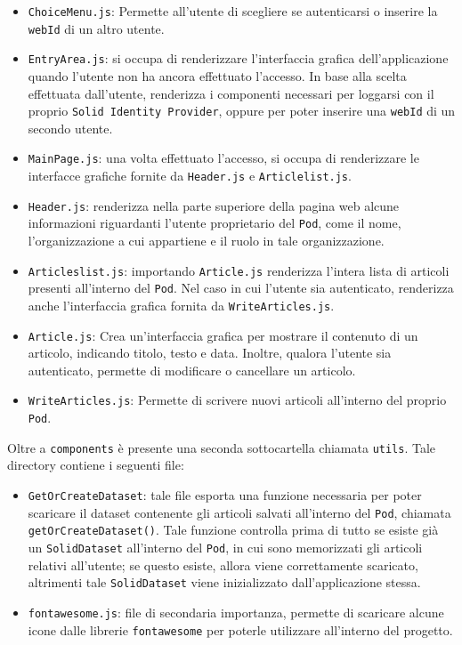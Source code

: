 \begin{itemize}
	\item {\tt ChoiceMenu.js}: Permette all'utente di scegliere se autenticarsi o inserire la {\tt webId} di un altro utente.
	\item {\tt EntryArea.js}: si occupa di renderizzare l'interfaccia grafica dell'applicazione quando l'utente non ha ancora effettuato l'accesso. In base alla scelta effettuata dall'utente, renderizza i componenti necessari per loggarsi con il proprio {\tt Solid Identity Provider}, oppure per poter inserire una {\tt webId} di un secondo utente.
	\item {\tt MainPage.js}: una volta effettuato l'accesso, si occupa di renderizzare le interfacce grafiche fornite da {\tt Header.js} e {\tt Articlelist.js}.
	\item {\tt Header.js}: renderizza nella parte superiore della pagina web alcune informazioni riguardanti l'utente proprietario del {\tt Pod}, come il nome, l'organizzazione a cui appartiene e il ruolo in tale organizzazione.
	\item {\tt Articleslist.js}: importando {\tt Article.js} renderizza l'intera lista di articoli presenti all'interno del {\tt Pod}. Nel caso in cui l'utente sia autenticato, renderizza anche l'interfaccia grafica fornita da {\tt WriteArticles.js}.
	\item {\tt Article.js}: Crea un'interfaccia grafica per mostrare il contenuto di un articolo, indicando titolo, testo e data. Inoltre, qualora l'utente sia autenticato, permette di modificare o cancellare un articolo.
	\item {\tt WriteArticles.js}: Permette di scrivere nuovi articoli all'interno del proprio {\tt Pod}.
\end{itemize}

\medskip

Oltre a {\tt components} è presente una seconda sottocartella chiamata {\tt utils}. Tale directory contiene i seguenti file:

\begin{itemize}
	\item {\tt GetOrCreateDataset}: tale file esporta una funzione necessaria per poter scaricare il dataset contenente gli articoli salvati all'interno del {\tt Pod}, chiamata\\{\tt getOrCreateDataset()}. Tale funzione controlla prima di tutto se esiste già un {\tt SolidDataset} all'interno del {\tt Pod}, in cui sono memorizzati gli articoli relativi all'utente; se questo esiste, allora viene correttamente scaricato, altrimenti tale {\tt SolidDataset} viene inizializzato dall'applicazione stessa.
	\item {\tt fontawesome.js}: file di secondaria importanza, permette di scaricare alcune icone dalle librerie {\tt fontawesome} per poterle utilizzare all'interno del progetto.
\end{itemize}

